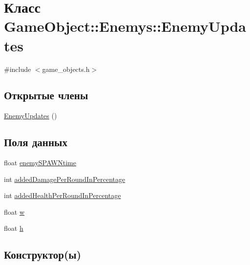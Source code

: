 \hypertarget{classGameObject_1_1Enemys_1_1EnemyUpdates}{}\section{Класс Game\+Object\+:\+:Enemys\+:\+:Enemy\+Updates}
\label{classGameObject_1_1Enemys_1_1EnemyUpdates}


{\ttfamily \#include $<$game\+\_\+objects.\+h$>$}

\subsection*{Открытые члены}
\begin{DoxyCompactItemize}
\item 
\hyperlink{classGameObject_1_1Enemys_1_1EnemyUpdates_af2b1e03c8f6bac7594703e1a15040644}{Enemy\+Updates} ()
\end{DoxyCompactItemize}
\subsection*{Поля данных}
\begin{DoxyCompactItemize}
\item 
float \hyperlink{classGameObject_1_1Enemys_1_1EnemyUpdates_ae9de980bafa27f9cd53a3ed09ed1a1b2}{enemy\+S\+P\+A\+W\+Ntime}
\item 
int \hyperlink{classGameObject_1_1Enemys_1_1EnemyUpdates_ad0584b4ae2460f318204b9e221d781d4}{added\+Damage\+Per\+Round\+In\+Percentage}
\item 
int \hyperlink{classGameObject_1_1Enemys_1_1EnemyUpdates_a7506081e1755536277fb8f388f57b395}{added\+Health\+Per\+Round\+In\+Percentage}
\item 
float \hyperlink{classGameObject_1_1Enemys_1_1EnemyUpdates_a02597f023815942af2e28ed6a3bf0c74}{w}
\item 
float \hyperlink{classGameObject_1_1Enemys_1_1EnemyUpdates_acfe6d4eef800ac30a8ae7b5f42b8553c}{h}
\end{DoxyCompactItemize}


\subsection{Конструктор(ы)}
